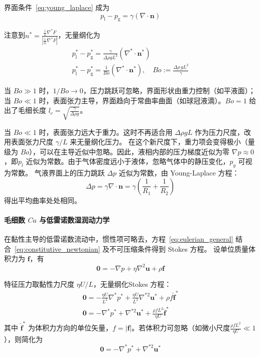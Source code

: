 界面条件~\eqref{eq:young_laplace} 成为
\[
p_{\text{l}} - p_{\text{g}} = \gamma (\nabla \cdot \mathbf{n})
\]

注意到\(n^* = \frac{\frac{1}{L}\nabla^* F}{\left |\frac{1}{L}\nabla^* F\right |}\)，无量纲化为
\begin{gather*}
p_{\text{l}}^* - p_{\text{g}}^* = \frac{\gamma}{\Delta\rho g L^{2}} (\nabla^* \cdot \mathbf{n}^*)\\
p_{\text{l}}^* - p_{\text{g}}^* = \frac{1}{Bo} (\nabla^* \cdot \mathbf{n}^*),\quad
Bo := \frac{\Delta\rho \, g L^{2}}{\gamma}
\end{gather*}

当 $Bo \gg 1$ 时，$1/Bo \to 0$，压力跳跃可忽略，界面形状由重力控制（如平液面）；当 $Bo \ll 1$ 时，表面张力主导，界面趋向于常曲率曲面（如球冠液滴）。$Bo = 1$ 给出了毛细长度
\(\displaystyle l_c = \sqrt{\frac{\gamma}{\Delta\rho g}}\)。
\begin{explain}
    当 $Bo \ll 1$ 时，表面张力远大于重力。这时不再适合用 $\Delta\rho g L$ 作为压力尺度，改用表面张力尺度 $\gamma/L$ 来无量纲化压力。
    在这个新尺度下，重力项会变得极小（量级为 $Bo$），可以在主导近似中忽略。因此，液相内部的压力梯度近似为零
\(
\nabla p \approx 0
\)，即$p_l$ 近似为常数。由于气体密度远小于液体，忽略气体中的静压变化，$p_g$ 可视为常数。
气液界面上的压力跳跃 $\Delta p$ 近似为常数，由 Young-Laplace 方程：
\[
\Delta p = \gamma \nabla \cdot \mathbf{n} = \gamma \left( \frac{1}{R_1} + \frac{1}{R_2} \right)
\]
得出平均曲率处处相同。
\end{explain}


\paragraph{毛细数 $Ca$ 与低雷诺数湿润动力学}
在黏性主导的低雷诺数流动中，惯性项可略去，方程~\eqref{eq:eulerian_general} 结合~\eqref{eq:constitutive_newtonian} 
及不可压缩条件得到 Stokes 方程。
设单位质量体积力为 $\mathbf{f}$，有
\begin{equation}
    \mathbf{0} = -\nabla p + \eta \nabla^2 \mathbf{u} + \rho \mathbf{f}
\end{equation}

特征压力取黏性力尺度 $\eta U/L$，无量纲化Stokes 方程：
\begin{gather*}
    \mathbf{0} = -\frac{\eta U}{L^2}\nabla^* p^* + \frac{\eta U}{L^2}\nabla^{*2} \mathbf{u}^* + \rho f \hat{\mathbf{f}}^*
\\
    \mathbf{0} = -\nabla^* p^* + \nabla^{*2} \mathbf{u}^* + \frac{\rho f L^2}{\eta U} \hat{\mathbf{f}}^*
\end{gather*}
其中 $\hat{\mathbf{f}}^*$ 为体积力方向的单位矢量，$f = |\mathbf{f}|$。若体积力可忽略（如微小尺度\(\frac{\rho f L^2}{\eta U} \ll 1\)），则简化为
\[
\mathbf{0} = -\nabla^* p^* + \nabla^{*2} \mathbf{u}^*
\]

